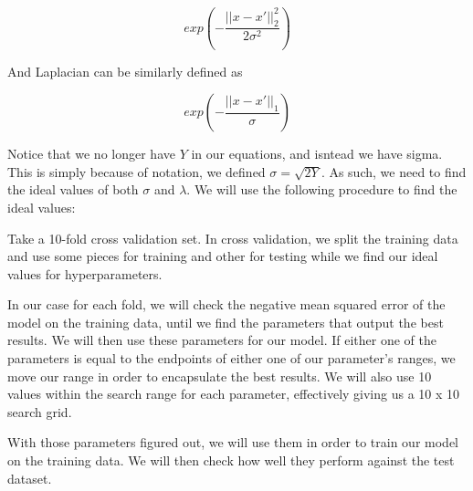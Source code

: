 \documentclass[11pt]{amsart}
\begin{document}
\[exp(-\frac{||x  - x'||^2_2}{2\sigma^2})\]

And Laplacian can be similarly defined as 

\[exp(-\frac{||x -  x'||_1}{\sigma})\]

Notice that we no longer have $Y$ in our equations, and isntead we have sigma. This is simply 
because of notation, we defined $\sigma = \sqrt{2Y}$. As such, we need to find the ideal 
values of both $\sigma$ and $\lambda$. We will use the following procedure to find the ideal values:

Take a 10-fold cross validation set. In cross validation, we split the training data and use some pieces for training and other 
for testing while we find our ideal values for hyperparameters. 

In our case for each fold, we will check the negative mean squared error of 
the model on the training data, until we find the parameters that output the best results. We will then use these 
parameters for our model. If either one of the parameters is equal to the endpoints of either one of our parameter's 
ranges, we move our range in order to encapsulate the best results. We will also use 10 values within the search range 
for each parameter, effectively giving us a 10 x 10 search grid. 

With those parameters figured out, we will use them in order to train our model on the training data. We will then check how well they perform 
against the test dataset. 
\end{document}
